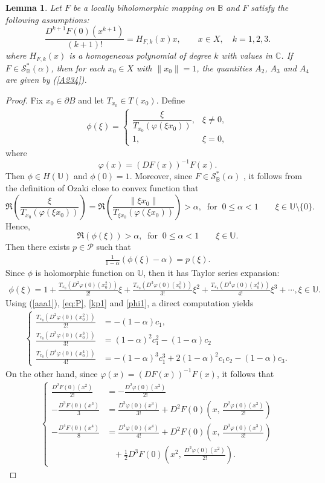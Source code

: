 \documentclass[11pt, reqno]{amsart}
\newtheorem{lem}{Lemma}[section]
\numberwithin{equation}{section}
\newcommand{\bea}{\begin{eqnarray}}
\newcommand{\eea}{\end{eqnarray}}
\begin{document}
\begin{lem}\label{L5} Let $F$ be a locally biholomorphic mapping on $\mathbb{B}$ and $F$ satisfy the following assumptions:
\begin{equation}\label{cc1}
\frac{D^{k+1}F(0)\left(x^{k+1}\right)}{(k+1)!}
= H_{F,k}(x)x,\qquad x\in X,\quad k=1,2,3.
\end{equation}
where $H_{F,k}(x)$ is a homogeneous polynomial of degree $k$ with values in $\mathbb{C}$. If $F\in \mathcal{S}_{\mathbb{B}}^{*}(\alpha)$, then for each $x_0\in X$ with $\|x_0\|=1$,  the quantities $A_2$, $A_3$ and $A_4$ are given by  (\ref{A234}).
\end{lem}
\begin{proof} Fix $x_0\in \partial B$ and let $T_{x_0}\in T(x_0)$. Define
\bea\label{aaa1}
\phi(\xi)=
\begin{cases}
\dfrac{\xi}{T_{x_0}\!\left(\varphi(\xi x_0)\right)}, & \xi\neq 0,\\[2mm]
1, & \xi=0,
\end{cases}
\eea
where
\[
\varphi(x)=(DF(x))^{-1}F(x).
\]
Then $\phi\in H(\mathbb U)$ and $\phi(0)=1$. Moreover, since
$F\in \mathcal{S}_{\mathbb{B}}^{*}(\alpha)$ , it follows from the definition of Ozaki close to convex function that
\[
\Re\!\left(\frac{\xi}{T_{x_0}\!\left(\varphi(\xi x_0)\right)}\right)
=
\Re\!\left(\frac{\|\xi x_0\|}{T_{\xi x_0}\!\left(\varphi(\xi x_0)\right)}\right)>\alpha,\;\;\text{for}\;\;0\leq \alpha < 1
\qquad \xi\in\mathbb U\setminus\{0\}.
\]
Hence,
\[\Re\!\left(\phi(\xi)\right)>\alpha,\;\;\text{for}\;\;0\leq \alpha < 1\qquad \xi\in\mathbb U.
\]
 Then there exists $p\in \mathcal{P}$ such that 
\bea\label{kp1}\frac{1}{1-\alpha}(\phi(\xi)-\alpha)=p(\xi).\eea
Since $\phi$ is holomorphic function on $\mathbb{U}$, then it has Taylor series expansion:
\bea\label{phi1}\phi(\xi)=1+\frac{T_{x_0}(D^2\varphi(0)(x_0^2))}{2!}\xi+\frac{T_{x_0}(D^3\varphi(0)(x_0^3))}{3!}\xi^2+\frac{T_{x_0}(D^4\varphi(0)(x_0^4))}{4!}\xi^3+\cdots,\xi\in \mathbb{U}.\eea
Using (\ref{aaa1}), \eqref{eq:P}, \eqref{kp1} and \eqref{phi1}, a direct computation yields
\bea\label{qq1}
\begin{cases} \frac{T_{x_0}(D^2\varphi(0)(x_0^2))}{2!}&=-(1-\alpha)c_1,\\
 \frac{T_{x_0}(D^3\varphi(0)(x_0^3))}{3!}&=(1-\alpha)^2 c_1^2-(1-\alpha)c_2\\
\frac{T_{x_0}(D^4\varphi(0)(x_0^4))}{4!}&=-(1-\alpha)^3 c_1^3+2(1-\alpha)^2 c_1c_2-(1-\alpha)c_3.
\end{cases}
\eea
On the other hand, since $\varphi(x)=(DF(x))^{-1}F(x)$, it follows that
\bea\label{qqq2}
\begin{cases}
\frac{D^{2}F(0)(x^{2})}{2!}&=-\frac{D^{2}\varphi(0)(x^{2})}{2!}\\
 -\frac{D^{3}F(0)(x^{3})}{3}&=\frac{D^{3}\varphi(0)(x^{3})}{3!}+D^{2}F(0)\!\left(x,\,\frac{D^{2}\varphi(0)(x^{2})}{2!}\right)\\
-\frac{D^{4}F(0)(x^{4})}{8}&=\frac{D^{4}\varphi(0)(x^{4})}{4!}+D^{2}F(0)\!\left(x,\,\frac{D^{3}\varphi(0)(x^{3})}{3!}\right)\\
&\;\;\;+\frac{1}{2}D^{3}F(0)\!\left(x^{2},\,\frac{D^{2}\varphi(0)(x^{2})}{2!}\right).
\end{cases}\eea


\end{proof}
\end{document}

